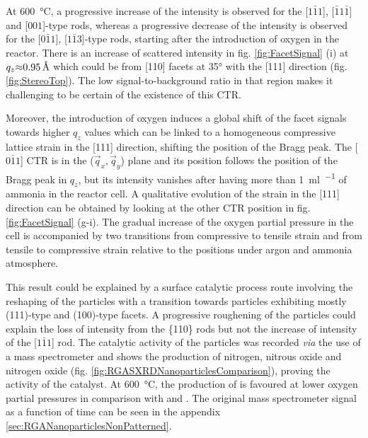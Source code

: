 At \qty{600}{\degreeCelsius}, a progressive increase of the intensity is observed for the [$1\bar{1}1$], [$\bar{1}1\bar{1}$] and [$001$]-type rods, whereas a progressive decrease of the intensity is observed for the [$0\bar{1}1$], [$1\bar{1}3$]-type rods, starting after the introduction of oxygen in the reactor.
There is an increase of scattered intensity in fig. \ref{fig:FacetSignal} (i) at $q_z \qty{\approx 0.95}{\angstrom}$ which could be from [110] facets at \ang{35} with the [111] direction (fig. \ref{fig:StereoTop}).
The low signal-to-background ratio in that region makes it challenging to be certain of the existence of this CTR.

Moreover, the introduction of oxygen induces a global shift of the facet signals towards higher $q_z$ values which can be linked to a homogeneous compressive lattice strain in the [111] direction, shifting the position of the Bragg peak.
The [$0\bar{1}1$] CTR is in the ($\vec{q}_x, \vec{q}_y$) plane and its position follows the position of the Bragg peak in $q_z$, but its intensity vanishes after having more than \qty{1}{\ml\per\min} of ammonia in the reactor cell.
A qualitative evolution of the strain in the [111] direction can be obtained by looking at the other CTR position in fig. \ref{fig:FacetSignal} (g-i).
The gradual increase of the oxygen partial pressure in the cell is accompanied by two transitions from compressive to tensile strain and from tensile to compressive strain relative to the positions under argon and ammonia atmosphere.

This result could be explained by a surface catalytic process route involving the reshaping of the particles with a transition towards particles exhibiting mostly (111)-type and (100)-type facets.
A progressive roughening of the particles could explain the loss of intensity from the \{110\} rods but not the increase of intensity of the [$1\bar{1}1$] rod.
The catalytic activity of the particles was recorded \textit{via} the use of a mass spectrometer and shows the production of nitrogen, nitrous oxide and nitrogen oxide (fig. \ref{fig:RGASXRDNanoparticlesComparison}), proving the activity of the catalyst.
At \qty{600}{\degreeCelsius}, the production of  is favoured at lower oxygen partial pressures in comparison with \nitrogendioxide and .
The original mass spectrometer signal as a function of time can be seen in the appendix \ref{sec:RGANanoparticlesNonPatterned}.

